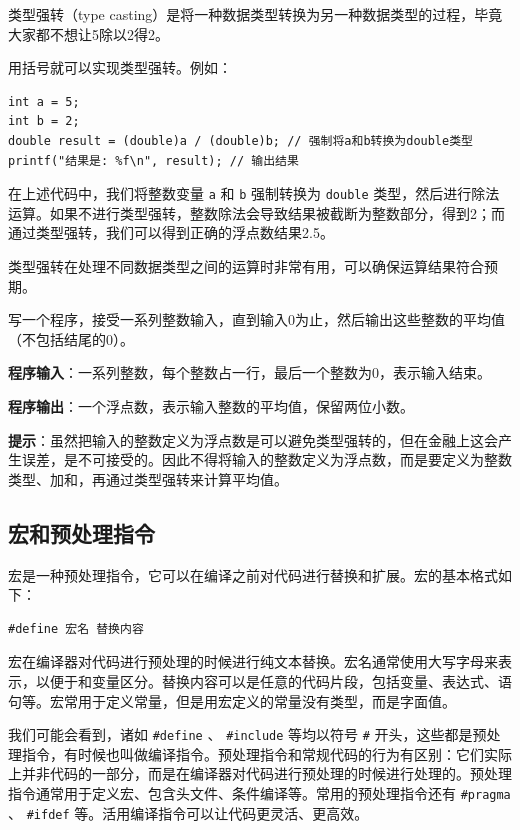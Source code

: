 类型强转（type casting）是将一种数据类型转换为另一种数据类型的过程，毕竟大家都不想让5除以2得2。

用括号就可以实现类型强转。例如：
\begin{verbatim}
int a = 5;
int b = 2;
double result = (double)a / (double)b; // 强制将a和b转换为double类型
printf("结果是: %f\n", result); // 输出结果
\end{verbatim}
在上述代码中，我们将整数变量 \texttt{a} 和 \texttt{b} 强制转换为 \texttt{double} 类型，然后进行除法运算。如果不进行类型强转，整数除法会导致结果被截断为整数部分，得到2；而通过类型强转，我们可以得到正确的浮点数结果2.5。

类型强转在处理不同数据类型之间的运算时非常有用，可以确保运算结果符合预期。

\begin{exercise}[求平均数]
写一个程序，接受一系列整数输入，直到输入0为止，然后输出这些整数的平均值（不包括结尾的0）。

\textbf{程序输入}：一系列整数，每个整数占一行，最后一个整数为0，表示输入结束。

\textbf{程序输出}：一个浮点数，表示输入整数的平均值，保留两位小数。

\textbf{提示}：虽然把输入的整数定义为浮点数是可以避免类型强转的，但在金融上这会产生误差，是不可接受的。因此不得将输入的整数定义为浮点数，而是要定义为整数类型、加和，再通过类型强转来计算平均值。
    
\end{exercise}

\subsection{宏和预处理指令}\label{sec:macro}

宏是一种预处理指令，它可以在编译之前对代码进行替换和扩展。宏的基本格式如下：
\begin{verbatim}
#define 宏名 替换内容
\end{verbatim}
宏在编译器对代码进行预处理的时候进行纯文本替换。宏名通常使用大写字母来表示，以便于和变量区分。替换内容可以是任意的代码片段，包括变量、表达式、语句等。宏常用于定义常量，但是用宏定义的常量没有类型，而是字面值。

我们可能会看到，诸如 \texttt{\#define} 、 \texttt{\#include} 等均以符号 \texttt{\#} 开头，这些都是预处理指令，有时候也叫做编译指令。预处理指令和常规代码的行为有区别：它们实际上并非代码的一部分，而是在编译器对代码进行预处理的时候进行处理的。预处理指令通常用于定义宏、包含头文件、条件编译等。常用的预处理指令还有 \texttt{\#pragma} 、 \texttt{\#ifdef} 等。活用编译指令可以让代码更灵活、更高效。

